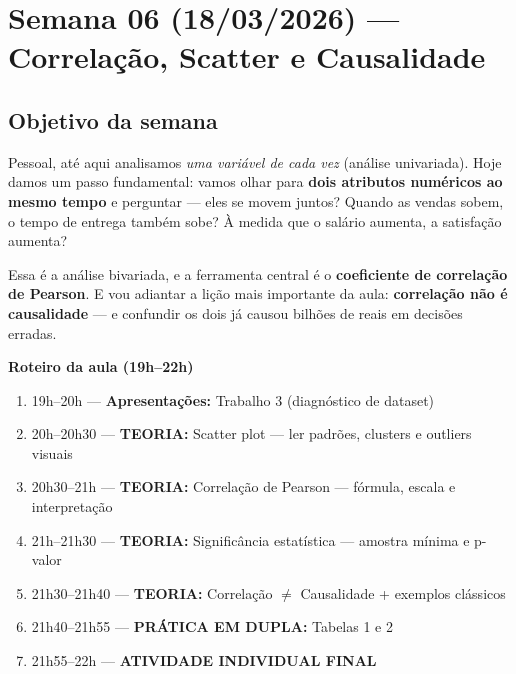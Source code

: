 
\chapter{Semana 06 (18/03/2026) — Correlação, Scatter e Causalidade}

\section{Objetivo da semana}

Pessoal, até aqui analisamos \emph{uma variável de cada vez} (análise
univariada). Hoje damos um passo fundamental: vamos olhar para \textbf{dois
atributos numéricos ao mesmo tempo} e perguntar — eles se movem juntos?
Quando as vendas sobem, o tempo de entrega também sobe? À medida que o
salário aumenta, a satisfação aumenta?

Essa é a análise bivariada, e a ferramenta central é o \textbf{coeficiente
de correlação de Pearson}. E vou adiantar a lição mais importante da aula:
\textbf{correlação não é causalidade} — e confundir os dois já causou
bilhões de reais em decisões erradas.

\begin{BoardBox}
\textbf{Roteiro da aula (19h–22h)}
\begin{enumerate}
  \item 19h–20h — \textbf{Apresentações:} Trabalho 3 (diagnóstico de dataset)
  \item 20h–20h30 — \textbf{TEORIA:} Scatter plot — ler padrões, clusters e outliers visuais
  \item 20h30–21h — \textbf{TEORIA:} Correlação de Pearson — fórmula, escala e interpretação
  \item 21h–21h30 — \textbf{TEORIA:} Significância estatística — amostra mínima e p-valor
  \item 21h30–21h40 — \textbf{TEORIA:} Correlação $\neq$ Causalidade + exemplos clássicos
  \item 21h40–21h55 — \textbf{PRÁTICA EM DUPLA:} Tabelas 1 e 2
  \item 21h55–22h — \textbf{ATIVIDADE INDIVIDUAL FINAL}
\end{enumerate}
\end{BoardBox}

